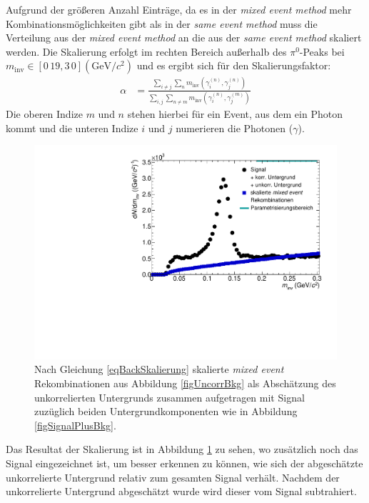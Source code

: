 Aufgrund der größeren Anzahl Einträge, da es in der \textit{mixed event method} mehr Kombinationsmöglichkeiten gibt als in der \textit{same event method} muss die Verteilung aus der \textit{mixed event method} an die aus der \textit{same event method} skaliert werden.
Die Skalierung erfolgt im rechten Bereich außerhalb des $\pi^{0}$-Peaks bei $m_\text{inv} \in \left[0\,19,3\,0\right] (\text{GeV/}c^{2})$ und es ergibt sich für den Skalierungsfaktor:
\begin{align}
\label{eqBackSkalierung}
\alpha &= \frac{\sum_{i \neq j}\sum_{n}m_{\text{inv}}\left( \gamma^{(n)}_{i},\gamma^{(n)}_{j}\right) }{\sum_{i,j}\sum_{n \neq m}m_{\text{inv}}\left( \gamma^{(n)}_{i},\gamma^{(m)}_{j}\right) }
\end{align}
Die oberen Indize $m$ und $n$ stehen hierbei für ein Event, aus dem ein Photon kommt und die unteren Indize $i$ und $j$ numerieren die Photonen ($\gamma$).
\begin{figure}[tp]
\centering
\includegraphics[width=.75\linewidth]{hUncorrBkgNorm.pdf}
\caption{Nach Gleichung \ref{eqBackSkalierung} skalierte {\it mixed event} Rekombinationen aus Abbildung \ref{figUncorrBkg} als Abschätzung des unkorrelierten Untergrunds zusammen aufgetragen mit Signal zuzüglich beiden Untergrundkomponenten wie in Abbildung \ref{figSignalPlusBkg}.}
\label{figUncorrBkgNorm}
\end{figure}
\newline
Das Resultat der Skalierung ist in Abbildung \ref{figUncorrBkgNorm} zu sehen, wo zusätzlich noch das Signal eingezeichnet ist, um besser erkennen zu können, wie sich der abgeschätzte unkorrelierte Untergrund relativ zum gesamten Signal verhält.
Nachdem der unkorrelierte Untergrund abgeschätzt wurde wird dieser vom Signal subtrahiert.
